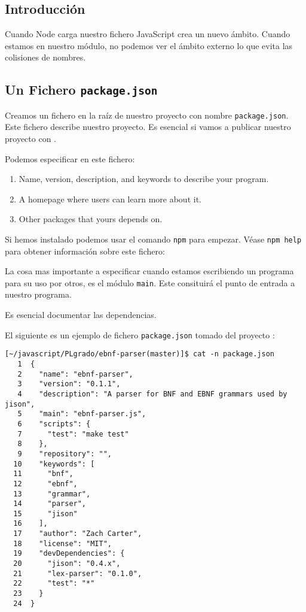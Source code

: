 
\subsection{Introducción}

Cuando Node carga nuestro fichero JavaScript
crea un nuevo ámbito. Cuando estamos en nuestro módulo, no podemos
ver el ámbito externo lo que evita las colisiones de nombres.

\subsection{Un Fichero {\tt package.json}}

Creamos un fichero en la raíz de nuestro proyecto con nombre 
\verb|package.json|. Este fichero describe nuestro proyecto.
Es esencial si vamos a publicar nuestro proyecto con 
\npm{}.

Podemos especificar en este fichero:

\begin{enumerate}
\item
Name, version, description, and keywords to describe your program.
\item
A homepage where users can learn more about it.
\item
Other packages that yours depends on.
\end{enumerate}

Si hemos instalado \npm{} podemos usar el comando 
\verb|npm|  para empezar.
Véase  \verb|npm help|
para obtener información sobre este fichero:

La cosa mas importante a especificar 
cuando estamos escribiendo un programa para su uso por otros,
es el módulo \verb|main|. Este consituirá el punto de entrada 
a nuestro programa.

Es esencial documentar las dependencias.

El siguiente es un ejemplo de fichero \verb|package.json| tomado
del proyecto \ebnfparser{}:
\begin{verbatim}
[~/javascript/PLgrado/ebnf-parser(master)]$ cat -n package.json 
   1  {
   2    "name": "ebnf-parser",
   3    "version": "0.1.1",
   4    "description": "A parser for BNF and EBNF grammars used by jison",
   5    "main": "ebnf-parser.js",
   6    "scripts": {
   7      "test": "make test"
   8    },
   9    "repository": "",
  10    "keywords": [
  11      "bnf",
  12      "ebnf",
  13      "grammar",
  14      "parser",
  15      "jison"
  16    ],
  17    "author": "Zach Carter",
  18    "license": "MIT",
  19    "devDependencies": {
  20      "jison": "0.4.x",
  21      "lex-parser": "0.1.0",
  22      "test": "*"
  23    }
  24  }
\end{verbatim}

